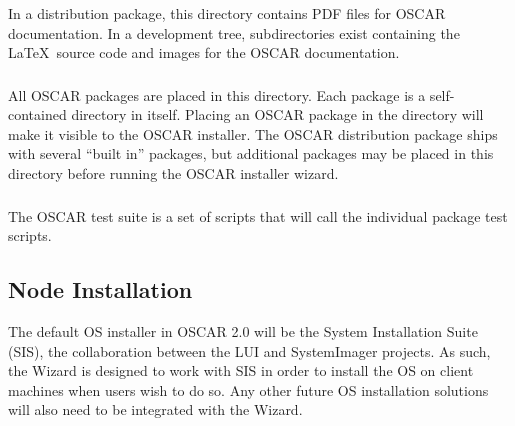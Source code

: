 
\subsubsection{}

In a distribution package, this directory contains PDF files for OSCAR
documentation.  In a development tree, subdirectories exist containing
the \LaTeX\ source code and images for the OSCAR documentation.


\subsubsection{}

All OSCAR packages are placed in this directory.  Each package is a
self-contained directory in itself.  Placing an OSCAR package
in the  directory will make it visible to the OSCAR
installer.  The OSCAR distribution package ships with several ``built
in'' packages, but additional packages may be placed in this directory
before running the OSCAR installer wizard.


\subsubsection{}

The OSCAR test suite is a set of scripts that will call the individual
package test scripts.


\subsection{Node Installation}

The default OS installer in OSCAR 2.0 will be the System Installation
Suite (SIS), the collaboration between the LUI and SystemImager
projects. As such, the Wizard is designed to work with SIS in order to
install the OS on client machines when users wish to do so.  Any other
future OS installation solutions will also need to be integrated with
the Wizard.


